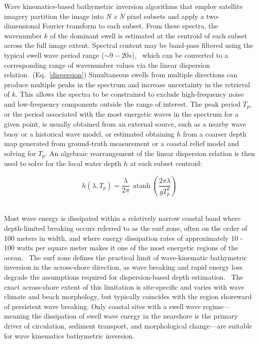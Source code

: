 \documentclass[12pt]{article}
\begin{document}
Wave kinematics-based bathymetric inversion algorithms that employ satellite imagery partition the image into \textit{N x N} pixel subsets and apply a two-dimensional Fourier transform to each subset. From these spectra, the wavenumber 
$k$ of the dominant swell is estimated at the centroid of each subset across the full image extent. Spectral content may be band-pass filtered using the typical swell wave period range ($\sim9 - 20 s$),~\cite{NWSMarineDefinitions} which can be converted to a corresponding range of wavenumber values via the linear dispersion relation.~(Eq.~\ref{dispersion}) Simultaneous swells from multiple directions can produce multiple peaks in the spectrum and increase uncertainty in the retrieval of $k$. This allows the spectra to be constrained to exclude high-frequency noise and low-frequency components outside the range of interest. The peak period $T_p$, or the period associated with the most energetic waves in the spectrum for a given point, is usually obtained from an external source, such as a nearby wave buoy or a historical wave model, or estimated obtaining $h$ from a coarser depth map generated from ground-truth measurement or a coastal relief model and solving for $T_p$. An algebraic rearrangement of the linear dispersion relation is then used to solve for the local water depth $h$ at each subset centroid:

\begin{equation}
h(\lambda, T_p) = \frac{\lambda}{2\pi} \,
\operatorname{atanh}\!\left( \frac{2\pi \lambda}{g T_p^2} \right)
\label{depth_inversion}
\end{equation}
~\cite{Mudiyanselage2024, Bergsma2019}

Most wave energy is dissipated within a relatively narrow coastal band where depth-limited breaking occurs referred to as the surf zone, often on the order of 100 meters in width, and where energy dissipation rates of approximately 10 - 100 watts per square meter makes it one of the most energetic regions of the ocean.~\cite{Holman2013} The surf zone defines the practical limit of wave-kinematic bathymetric inversion in the across-shore direction, as wave breaking and rapid energy loss degrade the assumptions required for dispersion-based depth estimation.~\cite{Mudiyanselage2024} The exact across-shore extent of this limitation is site-specific and varies with wave climate and beach morphology, but typically coincides with the region shoreward of persistent wave breaking. Only coastal sites with a swell wave regime---meaning the dissipation of swell wave energy in the nearshore is the primary driver of circulation, sediment transport, and morphological change---are suitable for wave kinematics bathymetric inversion.
\end{document}
